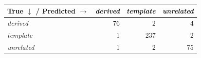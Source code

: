 \begin{tabular}{lrrr}
\toprule
True $\downarrow$ / Predicted $\rightarrow$ & \textit{derived} & \textit{template} & \textit{unrelated} \\
\midrule
\textit{derived} & 76 & 2 & 4 \\
\textit{template} & 1 & 237 & 2 \\
\textit{unrelated} & 1 & 2 & 75 \\
\bottomrule
\end{tabular}
